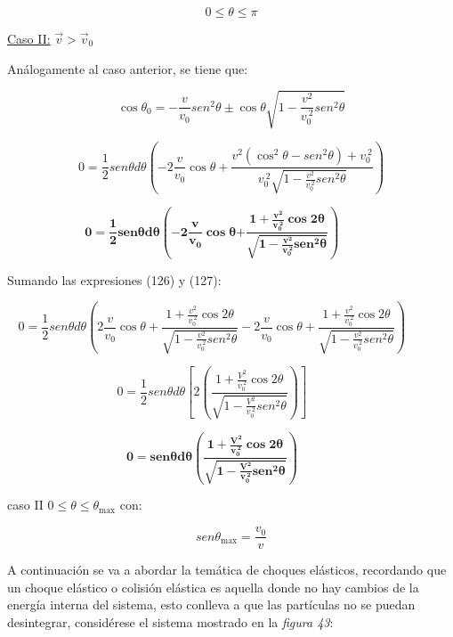 \documentclass[]{article}
\begin{document}
\[0 \leq \theta \leq \pi\]

\uline{Caso II:} \(\overrightarrow{v} > {\overrightarrow{v}}_{0}\)

Análogamente al caso anterior, se tiene que:

\[\cos\theta_{0} = - \frac{v}{v_{0}}{sen}^{2}\theta \pm \cos\theta\sqrt{1 - \frac{v^{2}}{v_{0}^{\ 2}}{sen}^{2}\theta}\]

\[0 = \frac{1}{2}{sen}\theta d\theta\left( - 2\frac{v}{v_{0}}\cos\theta + \frac{v^{2}\left( \cos^{2}\theta - {sen}^{2}\theta \right) + v_{0}^{\ 2}}{v_{0}^{\ 2}\sqrt{1 - \frac{v^{2}}{v_{0}^{\ 2}}{sen}^{2}\theta}} \right)\]

\[\mathbf{0 =}\frac{\mathbf{1}}{\mathbf{2}}\mathbf{sen}\mathbf{\theta}\mathbf{d\theta}\left( \mathbf{- 2}\frac{\mathbf{v}}{\mathbf{v}_{\mathbf{0}}}\mathbf{\cos}\mathbf{\theta}\mathbf{+}\frac{\mathbf{1 +}\frac{\mathbf{v}^{\mathbf{2}}}{\mathbf{v}_{\mathbf{0}}^{\mathbf{\ 2}}}\mathbf{\cos}{\mathbf{2}\mathbf{\theta}}}{\sqrt{\mathbf{1 -}\frac{\mathbf{v}^{\mathbf{2}}}{\mathbf{v}_{\mathbf{0}}^{\mathbf{\ 2}}}\mathbf{sen}^{\mathbf{2}}\mathbf{\theta}}} \right)\mathbf{\ \ \ \ \ \ \ \ \ \ \ \ \ \ }\]

Sumando las expresiones (126) y (127):

\[0 = \frac{1}{2}{sen}\theta d\theta\left( 2\frac{v}{v_{0}}\cos\theta + \frac{1 + \frac{v^{2}}{v_{0}^{\ 2}}\cos{2\theta}}{\sqrt{1 - \frac{v^{2}}{v_{0}^{\ 2}}{sen}^{2}\theta}} - 2\frac{v}{v_{0}}\cos\theta + \frac{1 + \frac{v^{2}}{v_{0}^{\ 2}}\cos{2\theta}}{\sqrt{1 - \frac{v^{2}}{v_{0}^{\ 2}}{sen}^{2}\theta}} \right)\ \ \ \ \ \ \ \ \ \ \ \ \ \ \]

\[0 = \frac{1}{2}{sen}\theta d\theta\left\lbrack 2\left( \frac{1 + \frac{V^{2}}{v_{0}^{\ 2}}\cos{2\theta}}{\sqrt{1 - \frac{V^{2}}{v_{0}^{\ 2}}{sen}^{2}\theta}} \right) \right\rbrack\ \ \ \ \ \ \ \ \ \ \ \ \ \ \]

\[\mathbf{0 =}\mathbf{sen}\mathbf{\theta}\mathbf{d\theta}\left( \frac{\mathbf{1 +}\frac{\mathbf{V}^{\mathbf{2}}}{\mathbf{v}_{\mathbf{0}}^{\mathbf{\ 2}}}\mathbf{\cos}{\mathbf{2}\mathbf{\theta}}}{\sqrt{\mathbf{1 -}\frac{\mathbf{V}^{\mathbf{2}}}{\mathbf{v}_{\mathbf{0}}^{\mathbf{\ 2}}}\mathbf{sen}^{\mathbf{2}}\mathbf{\theta}}} \right)\mathbf{\ \ \ \ \ \ \ \ \ \ \ \ \ \ }\]

caso II \(0 \leq \theta \leq \theta_{\max}\) con:

\[{sen}{\theta_{\max} =}\frac{v_{0}}{v}\]

A continuación se va a abordar la temática de choques elásticos,
recordando que un choque elástico o colisión elástica es aquella donde
no hay cambios de la energía interna del sistema, esto conlleva a que
las partículas no se puedan desintegrar, considérese el sistema mostrado
en la \emph{figura 43}:
\end{document}
